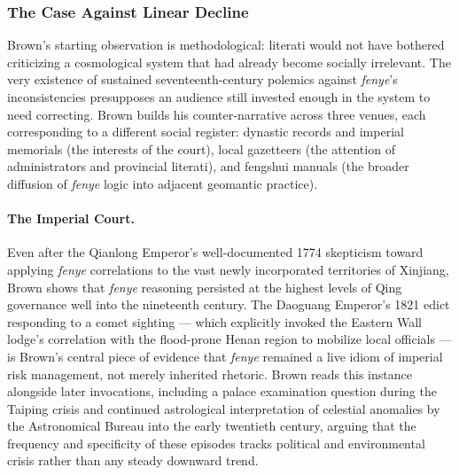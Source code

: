 \documentclass[10pt]{article}
\begin{document}
\subsubsection*{The Case Against Linear Decline}

Brown's starting observation is methodological: literati would not have bothered criticizing a cosmological system that had already become socially irrelevant. The very existence of sustained seventeenth-century polemics against \emph{fenye}'s inconsistencies presupposes an audience still invested enough in the system to need correcting. Brown builds his counter-narrative across three venues, each corresponding to a different social register: dynastic records and imperial memorials (the interests of the court), local gazetteers (the attention of administrators and provincial literati), and fengshui manuals (the broader diffusion of \emph{fenye} logic into adjacent geomantic practice).

\paragraph{The Imperial Court.} Even after the Qianlong Emperor's well-documented 1774 skepticism toward applying \emph{fenye} correlations to the vast newly incorporated territories of Xinjiang, Brown shows that \emph{fenye} reasoning persisted at the highest levels of Qing governance well into the nineteenth century. The Daoguang Emperor's 1821 edict responding to a comet sighting --- which explicitly invoked the Eastern Wall lodge's correlation with the flood-prone Henan region to mobilize local officials --- is Brown's central piece of evidence that \emph{fenye} remained a live idiom of imperial risk management, not merely inherited rhetoric. Brown reads this instance alongside later invocations, including a palace examination question during the Taiping crisis and continued astrological interpretation of celestial anomalies by the Astronomical Bureau into the early twentieth century, arguing that the frequency and specificity of these episodes tracks political and environmental crisis rather than any steady downward trend.
\end{document}

